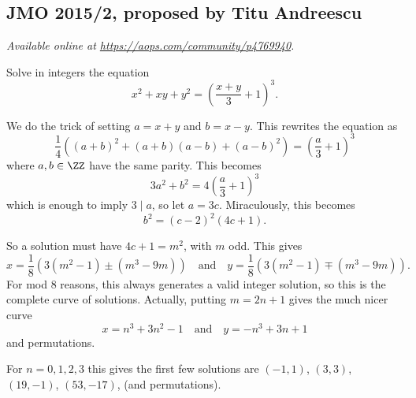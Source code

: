\documentclass[11pt]{scrartcl}
\begin{document}
\subsection{JMO 2015/2, proposed by Titu Andreescu}
\textsl{Available online at \url{https://aops.com/community/p4769940}.}
\begin{mdframed}[style=mdpurplebox,frametitle={Problem statement}]
Solve in integers the equation
\[ x^2+xy+y^2 = \left(\frac{x+y}{3}+1\right)^3. \]
\end{mdframed}
We do the trick of setting $a=x+y$ and $b=x-y$.
This rewrites the equation as
\[ \frac14\left( (a+b)^2+(a+b)(a-b)+(a-b)^2 \right)
  = \left( \frac a3 + 1 \right)^3 \]
where $a,b \in \ZZ$ have the same parity.
This becomes
\[ 3a^2+b^2 = 4\left( \frac a3 + 1 \right)^3 \]
which is enough to imply $3 \mid a$, so let $a = 3c$.
Miraculously, this becomes \[ b^2 = (c-2)^2 (4c+1). \]

So a solution must have $4c+1=m^2$, with $m$ odd.
This gives
\[ x = \frac 18 \left( 3 (m^2-1) \pm (m^3-9m)  \right)
  \quad\text{and}\quad
  y = \frac 18 \left( 3 (m^2-1) \mp (m^3-9m) \right).  \]
For mod $8$ reasons,
this always generates a valid integer solution,
so this is the complete curve of solutions.
Actually, putting $m=2n+1$ gives the much nicer curve
\[
 \boxed{x = n^3+3n^2-1
 \quad\text{and}\quad
 y = -n^3+3n+1}
\] and permutations.

For $n=0,1,2,3$ this gives the first few solutions
are $(-1,1)$, $(3,3)$, $(19,-1)$, $(53, -17)$, (and permutations).
\pagebreak
\end{document}
